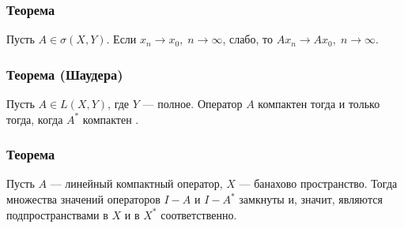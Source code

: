 \subsubsection*{Теорема}
Пусть $A \in \sigma(X, Y)$. Если $x_n \to x_0, \; n\to \infty$, слабо, то $Ax_n \to Ax_0, \; n \to \infty$.

\subsubsection*{Теорема (Шаудера)}
Пусть $A \in L(X, Y)$, где $Y$ ---  полное. Оператор $A$ компактен тогда и только тогда, когда $A^*$ компактен \cite[с.~205]{trenogin}.

\subsubsection*{Теорема}
Пусть $A$ --- линейный компактный оператор, $X$ --- банахово пространство. Тогда множества значений операторов $I - A$ и $I - A^*$ замкнуты и, значит, являются подпространствами в $X$ и в $X^*$ соответственно.